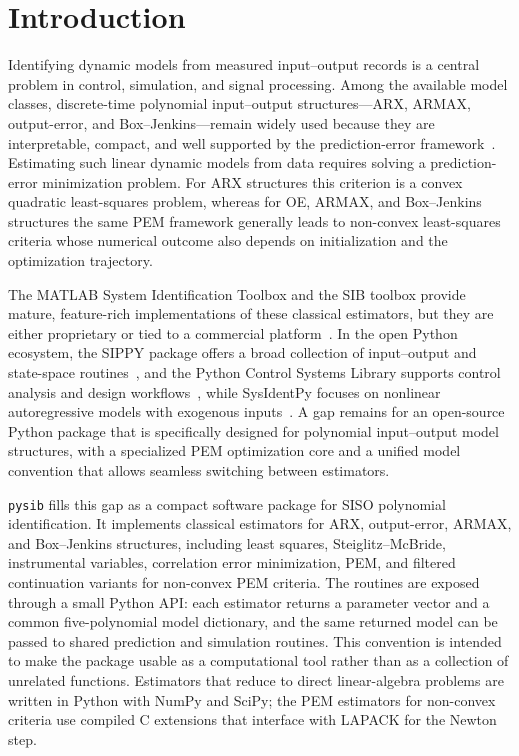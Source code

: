 \documentclass[acmsmall,screen,review]{acmart}
\begin{document}

\maketitle

\section{Introduction}
\label{sec:introduction}

Identifying dynamic models from measured input--output records is a
central problem in control, simulation, and signal processing.
Among the available model classes, discrete-time polynomial
input--output structures---ARX, ARMAX, output-error, and
Box--Jenkins---remain widely used because they are interpretable,
compact, and well supported by the prediction-error
framework~\cite{ljung1999,ljung2010,soderstrom1989}.
Estimating such linear dynamic models from data requires solving a
prediction-error minimization problem.  For ARX structures this criterion is a
convex quadratic least-squares problem, whereas for OE, ARMAX, and
Box--Jenkins structures the same PEM framework generally leads to non-convex
least-squares criteria whose numerical outcome also depends on initialization
and the optimization trajectory.

The MATLAB System Identification Toolbox and the SIB toolbox provide
mature, feature-rich implementations of these classical estimators,
but they are either proprietary or tied to a commercial
platform~\cite{mathworks_sysid,sib_matlab}.
In the open Python ecosystem, the SIPPY package offers a broad
collection of input--output and state-space routines~\cite{sippy},
and the Python Control Systems Library supports control analysis and
design workflows~\cite{pythoncontrol},
while SysIdentPy focuses on nonlinear autoregressive models with
exogenous inputs~\cite{sysidentpy}.
A gap remains for an open-source Python package that is specifically
designed for polynomial input--output model structures, with a specialized
PEM optimization core and a unified model convention that allows
seamless switching between estimators.

\texttt{pysib} fills this gap as a compact software package for SISO
polynomial identification.  It implements classical estimators for ARX,
output-error, ARMAX, and Box--Jenkins structures, including least squares,
Steiglitz--McBride, instrumental variables, correlation error minimization,
PEM, and filtered continuation variants for non-convex PEM criteria.  The
routines are exposed through a small Python API:
each estimator returns a parameter vector and a common five-polynomial model
dictionary, and the same returned model can be passed to shared prediction and
simulation routines.  This convention is intended to make the package usable as
a computational tool rather than as a collection of unrelated functions.
Estimators that reduce to direct linear-algebra problems are written in Python
with NumPy and SciPy; the PEM estimators for non-convex criteria use compiled
C extensions that interface with LAPACK for the Newton step.
\end{document}
